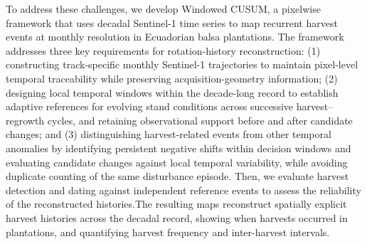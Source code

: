 To address these challenges, we develop Windowed CUSUM, a pixelwise framework that uses decadal Sentinel-1 time series to map recurrent harvest events at monthly resolution in Ecuadorian balsa plantations. The framework addresses three key requirements for rotation-history reconstruction: (1) constructing track-specific monthly Sentinel-1 trajectories to maintain pixel-level temporal traceability while preserving acquisition-geometry information; (2) designing local temporal windows within the decade-long record to establish adaptive references for evolving stand conditions across successive harvest--regrowth cycles, and retaining observational support before and after candidate changes;
and (3) distinguishing harvest-related events from other temporal anomalies by identifying persistent negative shifts within decision windows and evaluating candidate changes against local temporal variability, while avoiding duplicate counting of the same disturbance episode. Then, we evaluate harvest detection and dating against independent reference events to assess the reliability of the reconstructed histories.The resulting maps reconstruct spatially explicit harvest histories across the decadal record, showing when harvests occurred in plantations, and quantifying harvest frequency and inter-harvest intervals.



